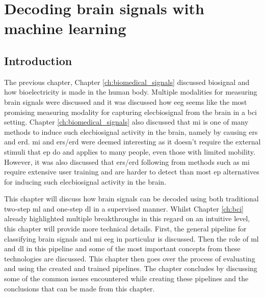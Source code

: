 

\glsresetall

\chapter{Decoding brain signals with machine learning}
\label{ch:processing_signals}

\section{Introduction}
\label{sec:processing_signals_introduction}

The previous chapter, Chapter \ref{ch:biomedical_signals} discussed \gls{biosignal} and how bioelectricity is made in the human body.
Multiple modalities for measuring brain signals were discussed and it was discussed how \gls{eeg} seems like the most promising measuring modality for capturing \gls{elecbiosignal} from the brain in a \gls{bci} setting.
Chapter \ref{ch:biomedical_signals} also discussed that \gls{mi} is one of many methods to induce such \gls{elecbiosignal} activity in the brain, namely by causing \gls{ers} and \gls{erd}.
\gls{mi} and \gls{ers}/\gls{erd} were deemed interesting as it doesn't require the external stimuli that \gls{ep} do and applies to many people, even those with limited mobility.
However, it was also discussed that \gls{ers}/\gls{erd} following from methods such as \gls{mi} require extensive user training and are harder to detect than most \gls{ep} alternatives for inducing such \gls{elecbiosignal} activity in the brain.

This chapter will discuss how brain signals can be decoded using both traditional two-step \gls{ml} and one-step \gls{dl} in a supervised manner.
Whilst Chapter \ref{ch:bci} already highlighted multiple breakthroughs in this regard on an intuitive level, this chapter will provide more technical details.
First, the general pipeline for classifying brain signals and \gls{mi} \gls{eeg} in particular is discussed.
Then the role of \gls{ml} and \gls{dl} in this pipeline and some of the most important concepts from these technologies are discussed.
This chapter then goes over the process of evaluating and using the created and trained pipelines.
The chapter concludes by discussing some of the common issues encountered while creating these pipelines and the conclusions that can be made from this chapter.


